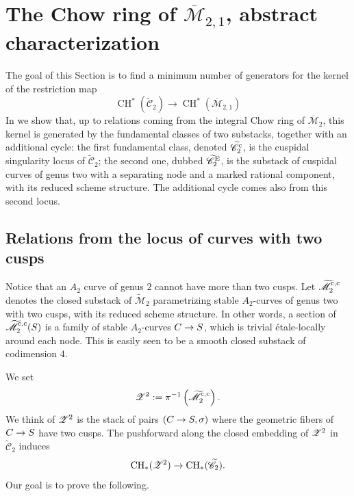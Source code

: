\documentclass[a4paper, 10pt]{amsart}
\numberwithin{equation}{section}
\numberwithin{subsection}{section}
\theoremstyle{definition}
\theoremstyle{remark}
\renewcommand{\mathcal}{\mathscr}
\newcommand\cM{\mathcal{M}} \newcommand\cN{\mathcal{N}}
\newcommand\arr{\ifinner\to\else\longrightarrow\fi}
\newcommand{\Mbar}{\overline{\cM}}
\newcommand{\Mtilde}{\widetilde{\mathcal M}}
\newcommand{\Ctilde}{\widetilde{\mathcal C}}
\newcommand{\ch}[1][*]{\operatorname{CH}^{#1}}
\begin{document}
	\section{The Chow ring of $\Mbar_{2,1}$, abstract characterization}\label{sec:abstract}
	The goal of this Section is to find a minimum number of generators for the kernel of the restriction map
	\[\ch(\Ctilde_2)\longrightarrow\ch(\Mbar_{2,1})\]
	In  we show that, up to relations coming from the integral Chow ring of $\Mbar_2$, this kernel is generated by the fundamental classes of two substacks, together with an additional cycle: the first fundamental class, denoted $\Ctilde_2^{\rm c}$, is the cuspidal singularity locus of $\Ctilde_2$; the second one, dubbed $\Ctilde_2^{\rm E}$, is the substack of cuspidal curves of genus two with a separating node and a marked rational component, with its reduced scheme structure. The additional cycle comes also from this second locus.
	
	\subsection{Relations from the locus of curves with two cusps}
	Notice that an $A_{2}$ curve of genus $2$ cannot have more than two cusps. Let $\Mtilde_2^{\rm c, \rm c}$ denotes the closed substack of $\Mtilde_2$ parametrizing stable $A_2$-curves of genus two with two cusps, with its reduced scheme structure. In other words, a section of $\Mtilde_2^{\rm c, \rm c}(S)$ is a family of stable $A_{2}$-curves $C \arr S$, which is trivial \'{e}tale-locally around each node. This is easily seen to be a smooth closed substack of codimension $4$.
	
	We set
	\[ \cZ^2 := \pi^{-1} \left( \Mtilde_2^{\rm{c,c}} \right). \]
	We think of $\cZ^2$ is the stack of pairs $(C\arr S,\sigma)$ where the geometric fibers of $C\arr S$ have two cusps. The pushforward along the closed embedding of $\cZ^2$ in $\Ctilde_2$ induces
	\[ {\rm CH}_*(\cZ^2) \arr {\rm CH}_*(\Ctilde_2). \]
	Our goal is to prove the following.
	
\end{document}
